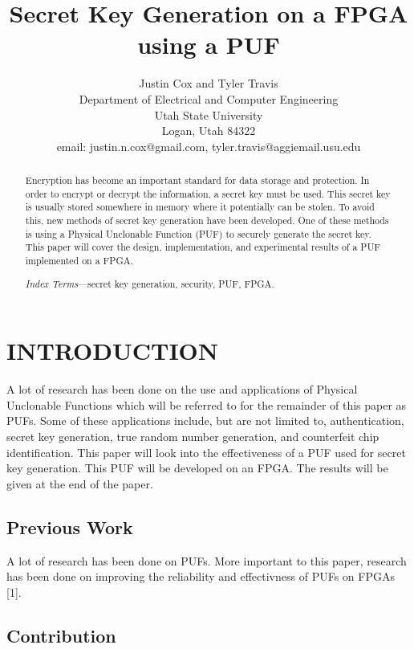 \documentclass[letterpaper, 10 pt, conference]{ieeeconf}  %
\title{\LARGE \bf
Secret Key Generation on a FPGA using a PUF  
}
\author{Justin Cox and Tyler Travis
\\ \small{Department of Electrical and Computer Engineering}
\\ \small{Utah State University}
\\ \small{Logan, Utah 84322}
\\ \small{email: justin.n.cox@gmail.com, tyler.travis@aggiemail.usu.edu}
}
\begin{document}
\maketitle
\thispagestyle{empty}
\pagestyle{empty}


\begin{abstract}

Encryption has become an important standard for data storage and protection.  In order to encrypt or decrypt the information, a secret key must be used.  This secret key is usually stored somewhere in memory where it potentially can be stolen.  To avoid this, new methods of secret key generation have been developed.  One of these methods is using a Physical Unclonable Function (PUF) to securely generate the secret key.  This paper will cover the design, implementation, and experimental results of a PUF implemented on a FPGA.

\emph{Index Terms}---secret key generation, security, PUF, FPGA.

\end{abstract}

\section{INTRODUCTION}

A lot of research has been done on the use and applications of Physical Unclonable Functions which will be referred to for the remainder of this paper as PUFs.  Some of these applications include, but are not limited to, authentication, secret key generation, true random number generation, and counterfeit chip identification.  This paper will look into the effectiveness of a PUF used for secret key generation.  This PUF will be developed on an FPGA.  The results will be given at the end of the paper.   

\subsection{Previous Work}

A lot of research has been done on PUFs.  More important to this paper, research has been done on improving the reliability and effectivness of PUFs on FPGAs [1].

\subsection{Contribution}
\end{document}
